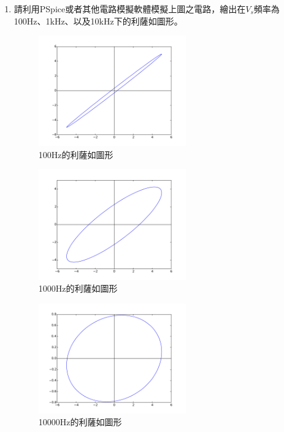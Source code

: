 \documentclass[12pt, a4paper]{article}
\def\large{\fontsize{14}{21}\selectfont}
\begin{document}
\begin{enumerate}[itemsep=20pt, topsep=10pt]
	\item {\large 請利用PSpice或者其他電路模擬軟體模擬上圖之電路，繪出在$V_s$頻率為100Hz、1kHz、以及10kHz下的利薩如圖形。} \\[10pt]

		\begin{figure}[H]
			\centering
			\includegraphics[width=0.6\textwidth]{p100.pdf}
			\caption{100Hz的利薩如圖形}
		\end{figure}
		\begin{figure}[H]
			\centering
			\includegraphics[width=0.6\textwidth]{p1000.pdf}
			\caption{1000Hz的利薩如圖形}
		\end{figure}
		\begin{figure}[H]
			\centering
			\includegraphics[width=0.6\textwidth]{p10000.pdf}
			\caption{10000Hz的利薩如圖形}
		\end{figure}
		

	\end{enumerate}

	
\end{document}
